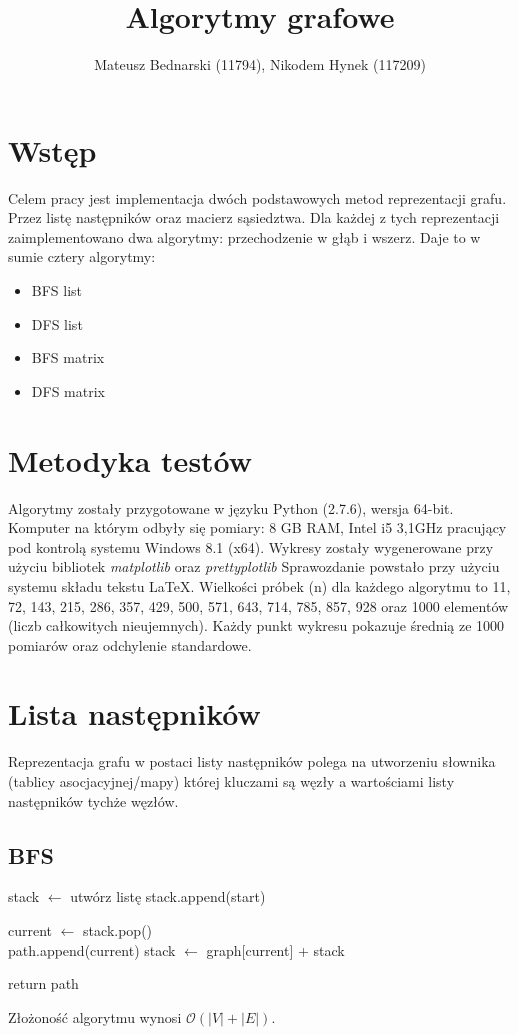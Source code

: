 \documentclass[12pt]{article}
\title{Algorytmy grafowe}
\author{Mateusz Bednarski (11794), Nikodem Hynek (117209)}
\date{}
\begin{document}
\maketitle

\section{Wstęp}
Celem pracy jest implementacja dwóch podstawowych metod reprezentacji grafu. Przez listę następników oraz macierz sąsiedztwa. Dla każdej z tych reprezentacji zaimplementowano dwa algorytmy: przechodzenie w głąb i wszerz. Daje to w sumie cztery algorytmy:

\begin{itemize}
\item BFS list
\item DFS list
\item BFS matrix
\item DFS matrix
\end{itemize}

\section{Metodyka testów}
Algorytmy zostały przygotowane w języku Python (2.7.6), wersja 64-bit. Komputer na którym odbyły się pomiary:
8 GB RAM, Intel i5 3,1GHz pracujący pod kontrolą systemu Windows 8.1 (x64). Wykresy zostały wygenerowane
przy użyciu bibliotek \emph{matplotlib} oraz \emph{prettyplotlib} Sprawozdanie powstało przy użyciu systemu składu tekstu \LaTeX .
Wielkości próbek (n) dla każdego algorytmu to 11, 72, 143, 215, 286, 357, 429, 500, 571, 643, 714, 785, 857, 928 oraz 1000 elementów (liczb całkowitych nieujemnych). Każdy punkt wykresu pokazuje średnią ze 1000 pomiarów oraz odchylenie standardowe.

\section{Lista następników}
Reprezentacja grafu w postaci listy następników polega na utworzeniu słownika (tablicy asocjacyjnej/mapy) której kluczami są węzły a wartościami listy następników tychże węzłów.
\subsection{BFS}

\begin{algorithm}[H]
\Begin
{
stack $\leftarrow$ utwórz listę stack.append(start) \\
	{
		current $\leftarrow$ 	stack.pop()\\
		{
		path.append(current)
		stack $\leftarrow$ graph[current] + stack
		} 
		
	}
	return path

	
}
\caption{BFS\textunderscore list}
\end{algorithm}	
Złożoność algorytmu wynosi $\mathcal{O}(|V| + |E|)$.
\end{document}
